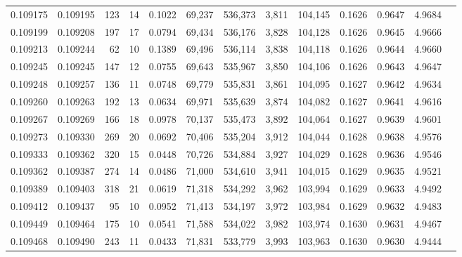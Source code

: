 \begin{tabular}{rrrrrrrrrrrrr}
0.109175 & 0.109195 &   123 &  14 &                                     0.1022 &  69,237 & 536,373 &   3,811 & 104,145 & 0.1626 & 0.9647 & 4.9684 \\
0.109199 & 0.109208 &   197 &  17 &                                     0.0794 &  69,434 & 536,176 &   3,828 & 104,128 & 0.1626 & 0.9645 & 4.9666 \\
0.109213 & 0.109244 &    62 &  10 &                                     0.1389 &  69,496 & 536,114 &   3,838 & 104,118 & 0.1626 & 0.9644 & 4.9660 \\
0.109245 & 0.109245 &   147 &  12 &                                     0.0755 &  69,643 & 535,967 &   3,850 & 104,106 & 0.1626 & 0.9643 & 4.9647 \\
0.109248 & 0.109257 &   136 &  11 &                                     0.0748 &  69,779 & 535,831 &   3,861 & 104,095 & 0.1627 & 0.9642 & 4.9634 \\
0.109260 & 0.109263 &   192 &  13 &                                     0.0634 &  69,971 & 535,639 &   3,874 & 104,082 & 0.1627 & 0.9641 & 4.9616 \\
0.109267 & 0.109269 &   166 &  18 &                                     0.0978 &  70,137 & 535,473 &   3,892 & 104,064 & 0.1627 & 0.9639 & 4.9601 \\
0.109273 & 0.109330 &   269 &  20 &                                     0.0692 &  70,406 & 535,204 &   3,912 & 104,044 & 0.1628 & 0.9638 & 4.9576 \\
0.109333 & 0.109362 &   320 &  15 &                                     0.0448 &  70,726 & 534,884 &   3,927 & 104,029 & 0.1628 & 0.9636 & 4.9546 \\
0.109362 & 0.109387 &   274 &  14 &                                     0.0486 &  71,000 & 534,610 &   3,941 & 104,015 & 0.1629 & 0.9635 & 4.9521 \\
0.109389 & 0.109403 &   318 &  21 &                                     0.0619 &  71,318 & 534,292 &   3,962 & 103,994 & 0.1629 & 0.9633 & 4.9492 \\
0.109412 & 0.109437 &    95 &  10 &                                     0.0952 &  71,413 & 534,197 &   3,972 & 103,984 & 0.1629 & 0.9632 & 4.9483 \\
0.109449 & 0.109464 &   175 &  10 &                                     0.0541 &  71,588 & 534,022 &   3,982 & 103,974 & 0.1630 & 0.9631 & 4.9467 \\
0.109468 & 0.109490 &   243 &  11 &                                     0.0433 &  71,831 & 533,779 &   3,993 & 103,963 & 0.1630 & 0.9630 & 4.9444 \\

\end{tabular}
